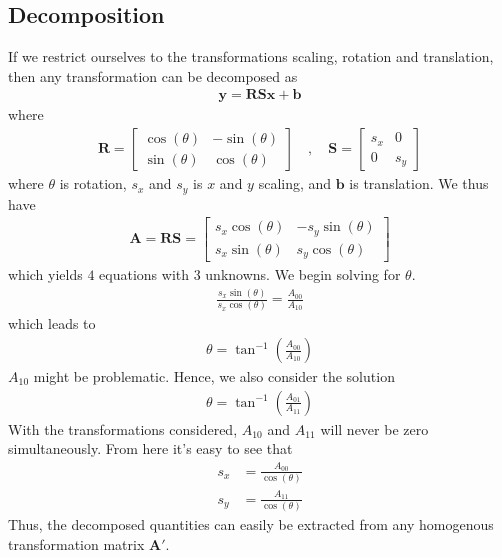 \documentclass[11pt,a4paper]{article}
\newcommand{\p}[1]{\left(#1\right)}
\begin{document}
\subsection{Decomposition}
If we restrict ourselves to the transformations scaling, rotation and translation,
then any transformation can be decomposed as
%
\begin{align}
  \mathbf{y} = \mathbf{R} \mathbf{S} \mathbf{x} + \mathbf{b}
\end{align}
%
where
%
\begin{align}
  \mathbf{R} = \begin{bmatrix}
    \cos(\theta) & -\sin(\theta) \\
    \sin(\theta) & \cos(\theta)
  \end{bmatrix}\quad,\quad
  \mathbf{S} = \begin{bmatrix}
    s_x & 0 \\ 0 & s_y                 
  \end{bmatrix}
\end{align}
%
where $\theta$ is rotation, $s_x$ and $s_y$ is $x$ and $y$ scaling,
and $\mathbf{b}$ is translation. We thus have
%
\begin{align}
  \mathbf{A} = \mathbf{RS} = \begin{bmatrix}
    s_x \cos(\theta) & -s_y \sin(\theta) \\
    s_x \sin(\theta) & s_y \cos(\theta)
  \end{bmatrix}
\end{align}
%
which yields $4$ equations with $3$ unknowns. We begin solving for $\theta$.
%
\begin{align}
  \frac{s_x \sin(\theta)}{s_x \cos(\theta)} = \frac{A_{00}}{A_{10}}
\end{align}
%
which leads to
%
\begin{align}
  \theta = \tan^{-1}\p{\frac{A_{00}}{A_{10}}}
\end{align}
% 
$A_{10}$ might be problematic. Hence, we also consider the solution
%
\begin{align}
  \theta = \tan^{-1}\p{\frac{A_{01}}{A_{11}}}
\end{align}
%
With the transformations considered, $A_{10}$ and $A_{11}$ will never
be zero simultaneously.  From here it's easy to see that
%
\begin{align}
  s_x &= \frac{A_{00}}{\cos(\theta)}\\
  s_y &= \frac{A_{11}}{\cos(\theta)}
\end{align}
%
Thus, the decomposed quantities can easily be extracted from any
homogenous transformation matrix $\mathbf{A}'$.
\end{document}

